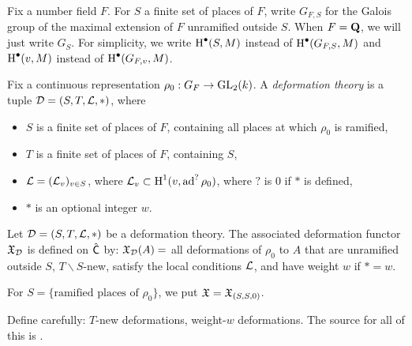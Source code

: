 \documentclass[phd,cornellheadings,draft]{cornell}
\begin{document}
Fix a number field $F$. 
For $S$ a finite set of places of $F$, write $G_{F,S}$ for the Galois group of the maximal extension of $F$ unramified outside $S$. 
When $F=\mathbf{Q}$, we will just write $G_S$. For simplicity, we write 
$\operatorname{H}^\bullet(S,M)$ instead of $\operatorname{H}^\bullet(G_{F,S},M)$ and 
$\operatorname{H}^\bullet(v,M)$ instead of $\operatorname{H}^\bullet(G_{F,v},M)$. 

Fix a continuous representation $\rho_0:G_F\to \operatorname{GL}_2(k)$. A \emph{deformation theory} is a tuple $\mathcal{D}=(S,T,\mathcal{L},\ast)$, where 
\begin{itemize}
  \item $S$ is a finite set of places of $F$, containing all places at which $\rho_0$ is ramified, 
  \item $T$ is a finite set of places of $F$, containing $S$, 
  \item $\mathcal{L}=(\mathcal{L}_v)_{v\in S}$, where $\mathcal{L}_v\subset \operatorname{H}^1(v,\operatorname{ad}^?\rho_0)$, where $?$ is $0$ if $\ast$ is defined, 
  \item $\ast$ is an optional integer $w$. 
\end{itemize}

\begin{definition}
Let $\mathcal{D}=(S,T,\mathcal{L},\ast)$ be a deformation theory. 
The associated deformation functor $\mathfrak{X}_{\mathcal{D}}$ is defined on $\hat{\mathsf{C}}$ by: $\mathfrak{X}_{\mathcal{D}}(A)=$ all deformations of $\rho_0$ to $A$ that are unramified outside $S$, $T\smallsetminus S$-new, satisfy the local conditions $\mathcal{L}$, and have weight $w$ if $\ast=w$. 
\end{definition}

For $S=\{\text{ramified places of }\rho_0\}$, we put $\mathfrak{X}=\mathfrak{X}_{(S,S,0)}$. 

Define carefully: $T$-new deformations, weight-$w$ deformations. The source for 
all of this is \cite{mazur-1995}. 





\printbibliography
\end{document}
